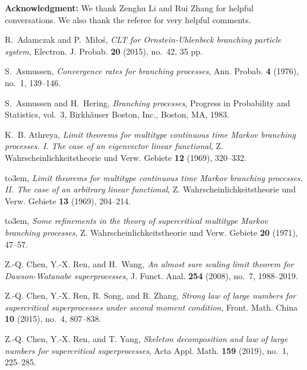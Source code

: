 \documentclass[12pt,a4paper]{amsart}
\theoremstyle{plain}
\theoremstyle{definition}
\numberwithin{equation}{section}
\begin{document}
\medskip
\noindent
{\bf Acknowledgment:}
	We thank Zenghu Li and Rui Zhang for helpful conversations.
	We also thank the referee for very helpful comments.
\medskip

\providecommand{\bysame}{\leavevmode\hbox to3em{\hrulefill}\thinspace}
\begin{thebibliography}{10}

R.~Adamczak and P.~Mi{\l}o\'{s}, \emph{C{LT} for {O}rnstein-{U}hlenbeck branching particle system},
  Electron. J. Probab. \textbf{20} (2015), no.~42, 35 pp.

  S.~Asmussen, \emph{Convergence rates for branching processes}, Ann.
  Probab.  \textbf{4} (1976), no.~1, 139--146.

S.~Asmussen and H.~Hering, \emph{Branching processes}, Progress in Probability
  and Statistics, vol.~3, Birkh\"{a}user Boston, Inc., Boston, MA, 1983.

K.~B. Athreya, \emph{Limit theorems for multitype continuous time {M}arkov
  branching processes. {I}. {T}he case of an eigenvector linear functional}, Z.
  Wahrscheinlichkeitstheorie und Verw. Gebiete \textbf{12} (1969), 320--332.

\bysame, \emph{Limit theorems for multitype continuous time {M}arkov branching
  processes. {II}. {T}he case of an arbitrary linear functional}, Z.
  Wahrscheinlichkeitstheorie und Verw. Gebiete \textbf{13} (1969), 204--214.

\bysame, \emph{Some refinements in the theory of supercritical multitype
  {M}arkov branching processes}, Z. Wahrscheinlichkeitstheorie und Verw.
  Gebiete \textbf{20} (1971), 47--57.


Z.-Q. Chen, Y.-X. Ren, and H.~Wang, \emph{An almost sure scaling limit theorem
  for {D}awson-{W}atanabe superprocesses}, J. Funct. Anal. \textbf{254} (2008),
  no.~7, 1988--2019.

  Z.-Q. Chen, Y.-X. Ren, R. Song, and R. Zhang,
 \emph{Strong law of large numbers for supercritical superprocesses under second moment condition}, Front. Math. China \textbf{10} (2015), no.~4, 807--838.


  Z.-Q. Chen, Y.-X. Ren,  and T. Yang,
 \emph{Skeleton decomposition and law of large numbers for supercritical superprocesses}, Acta Appl. Math. \textbf{159} (2019), no.~1, 225--285.


\end{thebibliography}
\end{document}
